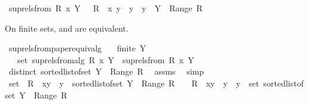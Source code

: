 \begin{isabellebody}
\ {\isachardoublequoteopen}sup{\isacharunderscore}rels{\isacharunderscore}from\ R\ x\ Y\ {\isacharequal}\ {\isacharbraceleft}\ R\ {\isacharplus}{\isacharasterisk}\ {\isacharbraceleft}{\isacharparenleft}x{\isacharcomma}\ y{\isacharparenright}{\isacharbraceright}\ {\isacharbar}\ y\ {\isachardot}\ y\ {\isasymin}\ Y\ {\isacharminus}\ Range\ R\ {\isacharbraceright}{\isachardoublequoteclose}%
\begin{isamarkuptext}%
On finite sets,  and  are equivalent.%
\end{isamarkuptext}%
\isamarkuptrue%
\isamarkupfalse%
\ sup{\isacharunderscore}rels{\isacharunderscore}from{\isacharunderscore}paper{\isacharunderscore}equiv{\isacharunderscore}alg{\isacharcolon}\isanewline
\ \ \ {\isachardoublequoteopen}finite\ Y{\isachardoublequoteclose}\isanewline
\ \ \ {\isachardoublequoteopen}set\ {\isacharparenleft}sup{\isacharunderscore}rels{\isacharunderscore}from{\isacharunderscore}alg\ R\ x\ Y{\isacharparenright}\ {\isacharequal}\ sup{\isacharunderscore}rels{\isacharunderscore}from\ R\ x\ Y{\isachardoublequoteclose}\isanewline
%
\isadelimproof
%
\endisadelimproof
%
\isatagproof
{}\isamarkupfalse%
\ {\isacharminus}\isanewline
\ \ \isamarkupfalse%
\ {\isachardoublequoteopen}distinct\ {\isacharparenleft}sorted{\isacharunderscore}list{\isacharunderscore}of{\isacharunderscore}set\ {\isacharparenleft}Y\ {\isacharminus}\ Range\ R{\isacharparenright}{\isacharparenright}{\isachardoublequoteclose}\ \isamarkupfalse%
\ assms\ \isamarkupfalse%
\ simp\isanewline
\ \ \isamarkupfalse%
\ \isamarkupfalse%
\ {\isachardoublequoteopen}set\ {\isacharbrackleft}\ R\ {\isacharplus}{\isacharasterisk}\ {\isacharbraceleft}{\isacharparenleft}x{\isacharcomma}y{\isacharparenright}{\isacharbraceright}\ {\isachardot}\ y\ {\isasymleftarrow}\ sorted{\isacharunderscore}list{\isacharunderscore}of{\isacharunderscore}set\ {\isacharparenleft}Y\ {\isacharminus}\ Range\ R{\isacharparenright}\ {\isacharbrackright}\ {\isacharequal}\ {\isacharbraceleft}\ R\ {\isacharplus}{\isacharasterisk}\ {\isacharbraceleft}{\isacharparenleft}x{\isacharcomma}y{\isacharparenright}{\isacharbraceright}\ {\isacharbar}\ y\ {\isachardot}\ y\ {\isasymin}\ set\ {\isacharparenleft}sorted{\isacharunderscore}list{\isacharunderscore}of{\isacharunderscore}set\ {\isacharparenleft}Y\ {\isacharminus}\ Range\ R{\isacharparenright}{\isacharparenright}\ {\isacharbraceright}{\isachardoublequoteclose}\ \ \ \ \isamarkupfalse%

\end{isabellebody}
